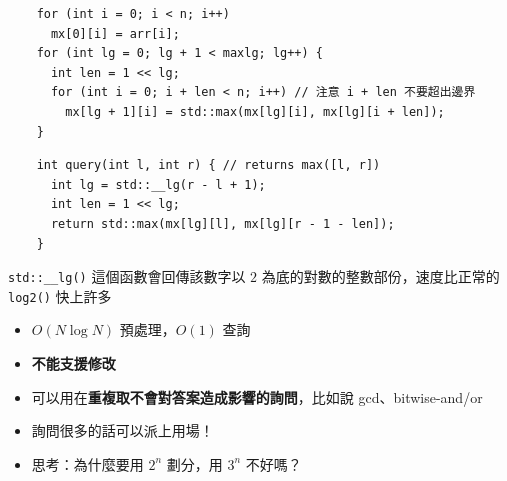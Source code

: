 \documentclass[standalone]{beamer}
\begin{document}
\begin{frame}[fragile]{}
  \begin{verbatim}
    for (int i = 0; i < n; i++)
      mx[0][i] = arr[i];
    for (int lg = 0; lg + 1 < maxlg; lg++) {
      int len = 1 << lg;
      for (int i = 0; i + len < n; i++) // 注意 i + len 不要超出邊界
        mx[lg + 1][i] = std::max(mx[lg][i], mx[lg][i + len]);
    }
  \end{verbatim}
\end{frame}

\begin{frame}[fragile]{}
  \begin{verbatim}
    int query(int l, int r) { // returns max([l, r])
      int lg = std::__lg(r - l + 1);
      int len = 1 << lg;
      return std::max(mx[lg][l], mx[lg][r - 1 - len]);
    }
  \end{verbatim}

  \texttt{std::\_\_lg()} 這個函數會回傳該數字以 $2$ 為底的對數的整數部份，速度比正常的 \texttt{log2()} 快上許多
\end{frame}

\begin{frame}[fragile]{}
  \begin{itemize}
    \item $O(N \log N)$ 預處理，$O(1)$ 查詢
    \item \textbf{不能支援修改}
    \item 可以用在\textbf{重複取不會對答案造成影響的詢問}，比如說 gcd、bitwise-and/or
    \item 詢問很多的話可以派上用場！
    \item 思考：為什麼要用 $2^n$ 劃分，用 $3^n$ 不好嗎？
  \end{itemize}
\end{frame}
\end{document}
